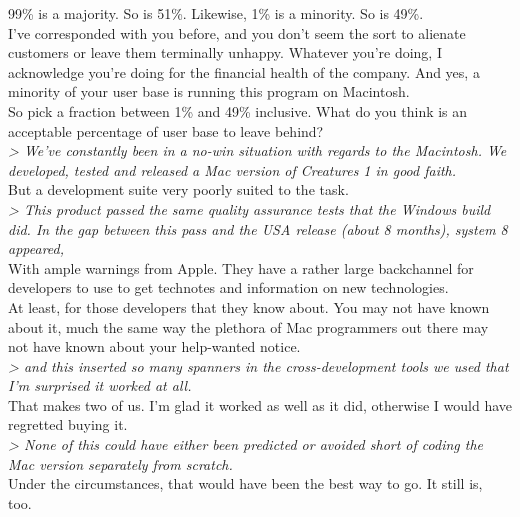 \documentclass[11pt,twoside,a4paper]{article}
\begin{document}
\begin{multicols*}{2}
99\% is a majority. So is 51\%. Likewise, 1\% is a minority. So is 49\%.~\\

I've corresponded with you before, and you don't seem the sort to alienate customers or leave them terminally unhappy. Whatever you're doing, I acknowledge you're doing for the financial health of the company. And yes, a minority of your user base is running this program on Macintosh.~\\

So pick a fraction between 1\% and 49\% inclusive. What do you think is an acceptable percentage of user base to leave behind?~\\

\emph{> We've constantly been in a no-win situation with regards to the Macintosh. We developed, tested and released a Mac version of Creatures 1 in good faith.}~\\

But a development suite very poorly suited to the task.~\\

\emph{> This product passed the same quality assurance tests that the Windows build did. In the gap between this pass and the USA release (about 8 months), system 8 appeared,}~\\

With ample warnings from Apple. They have a rather large backchannel for developers to use to get technotes and information on new technologies.~\\

At least, for those developers that they know about. You may not have known about it, much the same way the plethora of Mac programmers out there may not have known about your help-wanted notice.~\\

\emph{> and this inserted so many spanners in the cross-development tools we used that I'm surprised it worked at all.}~\\

That makes two of us. I'm glad it worked as well as it did, otherwise I would have regretted buying it.~\\

\emph{> None of this could have either been predicted or avoided short of coding the Mac version separately from scratch.}~\\

Under the circumstances, that would have been the best way to go. It still is, too.~\\


\end{multicols*}
\end{document}

